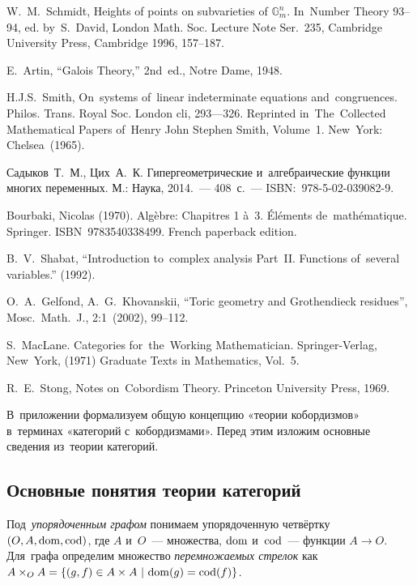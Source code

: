\documentclass{article}
\begin{document}
\begin{thebibliography}{9}

 W.~M.~Schmidt, Heights of points on subvarieties of $\mathbb{G}^n_m$.
In~Number Theory 93–94, ed. by~S.~David, London Math. Soc. Lecture Note Ser.~235,
Cambridge University Press, Cambridge 1996, 157–187.

 E.~Artin, “Galois Theory,” 2nd~ed., Notre Dame, 1948.

 H.J.S.~Smith, On~systems of~linear indeterminate equations and~congruences. Philos. Trans. Royal
Soc. London cli, 293—326. Reprinted in~The~Collected Mathematical Papers of~Henry John Stephen Smith,
Volume~1. New~York: Chelsea~(1965).

 Садыков~Т.~М., Цих~А.~К. Гипергеометрические и~алгебраические функции многих переменных.
М.: Наука, 2014.~— 408 с.~— ISBN: 978-5-02-039082-9.

 Bourbaki, Nicolas (1970). Algèbre: Chapitres 1 à~3. Éléments de~mathématique. Springer. ISBN~9783540338499. French paperback edition.

 B.~V.~Shabat, “Introduction to~complex analysis Part~II. Functions of~several variables.” (1992).

 O.~A.~Gelfond, A.~G.~Khovanskii, “Toric geometry and Grothendieck residues”, Mosc.~Math.~J., 2:1~(2002), 99–112.

 S.~MacLane. Categories for~the~Working Mathematician. Springer-Verlag, New~York, (1971) Graduate Texts in Mathematics, Vol.~5.

 R.~E.~Stong, Notes on~Cobordism Theory. Princeton University Press, 1969.

\end{thebibliography}
\pagebreak

\renewcommand{\thesection}{\Alph{section}}
\setcounter{section}{1}
\setcounter{subsection}{0}


В~приложении формализуем общую концепцию «теории кобордизмов» в~терминах «категорий с~кобордизмами».
Перед этим изложим основные сведения из~теории категорий.

\subsection{Основные понятия теории категорий}

Под~\textit{упорядоченным графом} \cite{MacLane71} понимаем упорядоченную четвёртку $(O, A, \mathrm{dom}, \mathrm{cod})$,
где $A$ и~$O$~— множества, $\mathrm{dom}$ и~$\mathrm{cod}$~— функции $A \rightarrow O$.
Для~графа определим множество \textit{перемножаемых стрелок} как $A \times_O A = \{ (g, f) \in A \times A \ |\ \dom(g) = \cod(f) \}$.
\end{document}
